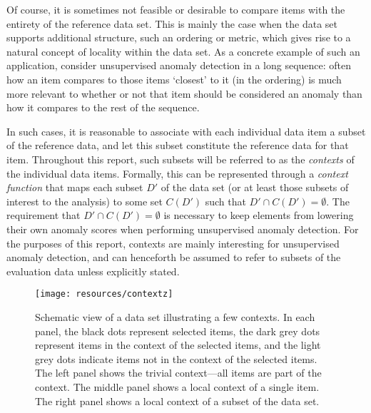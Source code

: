 Of course, it is sometimes not feasible or desirable to compare items with the entirety of the reference data set. This is mainly the case when the data set supports additional structure, such an ordering or metric, which gives rise to a natural concept of locality within the data set. As a concrete example of such an application, consider unsupervised anomaly detection in a long sequence: often how an item compares to those items `closest' to it (in the ordering) is much more relevant to whether or not that item should be considered an anomaly than how it compares to the rest of the sequence.

In such cases, it is reasonable to associate with each individual data item a subset of the reference data, and let this subset constitute the reference data for that item. Throughout this report, such subsets will be referred to as the \emph{contexts} of the individual data items. Formally, this can be represented through a \emph{context function} that maps each subset $D'$ of the data set (or at least those subsets of interest to the analysis) to some set $C(D')$ such that $D' \cap C(D') = \emptyset$. The requirement that $D' \cap C(D') = \emptyset$ is necessary to keep elements from lowering their own anomaly scores when performing unsupervised anomaly detection. For the purposes of this report, contexts are mainly interesting for unsupervised anomaly detection, and can henceforth be assumed to refer to subsets of the evaluation data unless explicitly stated.

\begin{figure}[thb]
    \vspace{-4pt}
    \begin{center}
        \leavevmode
        \texttt{[image: resources/contextz]}
    \end{center}
    \vspace{-15pt}
    \caption{{\small Schematic view of a data set illustrating a few contexts. In each panel, the black dots represent selected items, the dark grey dots represent items in the context of the selected items, and the light grey dots indicate items not in the context of the selected items. The left panel shows the trivial context---all items are part of the context. The middle panel shows a local context of a single item. The right panel shows a local context of a subset of the data set.}}
\label{fig:contexts}
    \vspace{-5pt}
\end{figure}

